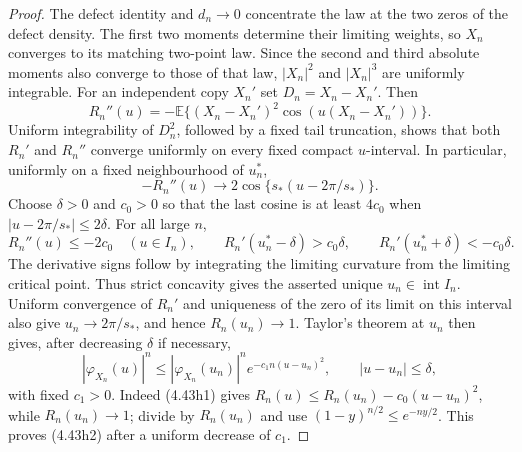 \documentclass[11pt,a4paper]{article}
\numberwithin{equation}{section}
\theoremstyle{definition}
\theoremstyle{remark}
\newcommand{\E}{\mathbb E}
\begin{document}
\begin{proof}
The defect identity and $d_n\to0$ concentrate the law at the two zeros of
the defect density.  The first two moments determine their limiting
weights, so $X_n$ converges to its matching two-point law.  Since the
second and third absolute moments also converge to those of that law,
$|X_n|^2$ and $|X_n|^3$ are uniformly integrable.  For an independent
copy $X_n'$ set $D_n=X_n-X_n'$.  Then
\[
 R_n''(u)=-\E\{(X_n-X_n')^2\cos(u(X_n-X_n'))\}.
\]
Uniform integrability of $D_n^2$, followed by a fixed tail truncation,
shows that both $R_n'$ and $R_n''$ converge uniformly on every fixed
compact $u$-interval.  In particular, uniformly on a fixed neighbourhood
of $u_n^*$,
\[
 -R_n''(u)\longrightarrow
 2\cos\{s_*(u-2\pi/s_*)\}.
\]
Choose $\delta>0$ and $c_0>0$ so that the last cosine is at least $4c_0$
when $|u-2\pi/s_*|\le2\delta$.  For all large $n$,
\[
 R_n''(u)\le-2c_0\quad(u\in I_n),\qquad
 R_n'(u_n^*-\delta)>c_0\delta,\qquad
 R_n'(u_n^*+\delta)<-c_0\delta.                       \tag{4.43h1}
\]
The derivative signs follow by integrating the limiting curvature from
the limiting critical point.  Thus strict concavity gives the asserted
unique $u_n\in\operatorname {int}I_n$.  Uniform convergence of $R_n'$
and uniqueness of the zero of its limit on this interval also give
$u_n\to2\pi/s_*$, and hence $R_n(u_n)\to1$.  Taylor's theorem at $u_n$
then gives, after decreasing $\delta$ if necessary,
\[
 |\varphi_{X_n}(u)|^n
 \le |\varphi_{X_n}(u_n)|^n
       e^{-c_1n(u-u_n)^2},\qquad |u-u_n|\le\delta,     \tag{4.43h2}
\]
with fixed $c_1>0$.  Indeed (4.43h1) gives
$R_n(u)\le R_n(u_n)-c_0(u-u_n)^2$, while
$R_n(u_n)\to1$; divide by $R_n(u_n)$ and use
$(1-y)^{n/2}\le e^{-ny/2}$.  This proves (4.43h2) after a uniform
decrease of $c_1$.


\end{proof}
\end{document}
